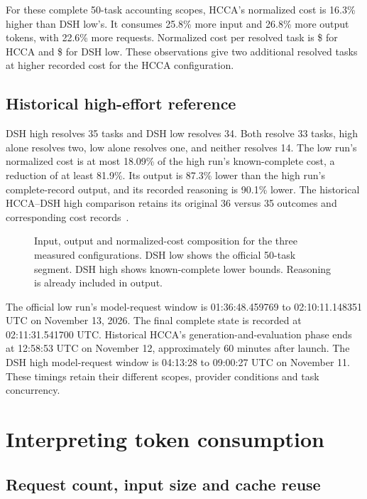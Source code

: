 \documentclass[10pt,a4paper]{article}
\begin{document}
For these complete 50-task accounting scopes, HCCA's normalized cost is
16.3\% higher than DSH low's. It consumes 25.8\% more input and 26.8\% more
output tokens, with 22.6\% more requests. Normalized cost per resolved task is
\$\HCostPerResolved{} for HCCA and \$\LCostPerResolved{} for DSH low.
These observations give two additional resolved tasks at higher recorded cost
for the HCCA configuration.

\subsection{Historical high-effort reference}

DSH high resolves 35 tasks and DSH low resolves 34. Both resolve 33 tasks,
high alone resolves two, low alone resolves one, and neither resolves 14.
The low run's normalized cost is at most 18.09\% of the high run's
known-complete cost, a reduction of at least 81.9\%. Its output is 87.3\%
lower than the high run's complete-record output, and its recorded reasoning
is 90.1\% lower. The historical HCCA--DSH high comparison retains its original
36 versus 35 outcomes and corresponding cost records~\cite{historical}.

\begin{figure}[ht]
\centering

\caption{Input, output and normalized-cost composition for the three measured
configurations. DSH low shows the official 50-task segment. DSH high shows
known-complete lower bounds. Reasoning is already included in output.}
\label{fig:usage}
\end{figure}

The official low run's model-request window is 01:36:48.459769 to
02:10:11.148351 UTC on November 13, 2026. The final complete state is recorded
at 02:11:31.541700 UTC. Historical HCCA's generation-and-evaluation phase ends
at 12:58:53 UTC on November 12, approximately 60 minutes after launch. The
DSH high model-request window is 04:13:28 to 09:00:27 UTC on November 11.
These timings retain their different scopes, provider conditions and task
concurrency.

\section{Interpreting token consumption}

\subsection{Request count, input size and cache reuse}
\end{document}
